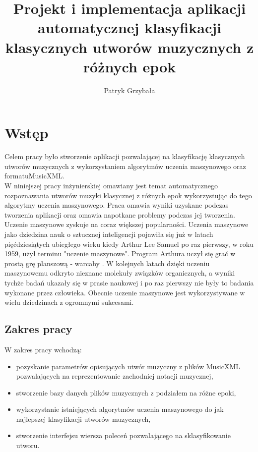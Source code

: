 \documentclass[printmode, eng]{mgr}
\title{Projekt i implementacja aplikacji automatycznej klasyfikacji klasycznych utworów muzycznych z różnych epok}
\author{Patryk Grzybała}
\newcommand\blankpage{%
    \null
    \thispagestyle{empty}%
    \addtocounter{page}{-1}%
    \newpage}
\newcommand\tab[1][1cm]{\hspace*{#1}}
\begin{document}
\maketitle
\tableofcontents
{
\listoffigures

\listoftables
}
\chapter{Wstęp}
\tab Celem pracy było stworzenie aplikacji pozwalającej na klasyfikację klasycznych utworów muzycznych z wykorzystaniem algorytmów uczenia maszynowego oraz formatu\linebreak MusicXML.\\
\tab W niniejszej pracy inżynierskiej omawiany jest temat automatycznego rozpoznawania utworów muzyki klasycznej z różnych epok wykorzystując do tego algorytmy uczenia maszynowego. Praca omawia wyniki uzyskane podczas tworzenia aplikacji oraz omawia napotkane problemy podczas jej tworzenia. \\

\tab Uczenie maszynowe zyskuje na coraz większej popularności. Uczenia maszynowe jako dziedzina nauk o sztucznej inteligencji pojawiła się już w latach pięćdziesiątych ubiegłego wieku kiedy Arthur Lee Samuel po raz pierwszy, w roku 1959, użył terminu "uczenie maszynowe". Program Arthura uczył się grać w prostą grę planszową - warcaby \cite{mlearn}. \linebreak W kolejnych latach dzięki uczeniu maszynowemu odkryto nieznane molekuły związków organicznych, a wyniki tychże badań ukazały się w prasie naukowej i po raz pierwszy nie były to badania wykonane przez człowieka. Obecnie uczenie maszynowe jest wykorzystywane w wielu dziedzinach z ogromnymi sukcesami.
\section{Zakres pracy}
\tab W zakres pracy wchodzą:
\begin{itemize}
\item pozyskanie parametrów opisujących utwór muzyczny z plików MusicXML \cite{mxml} pozwalających na reprezentowanie zachodniej notacji muzycznej,
\item stworzenie bazy danych plików muzycznych z podziałem na różne epoki,
\item wykorzystanie istniejących algorytmów uczenia maszynowego do jak najlepszej klasyfikacji utworów muzycznych,
\item stworzenie interfejsu wiersza poleceń pozwalającego na sklasyfikowanie utworu.
\end{itemize}
\end{document}
